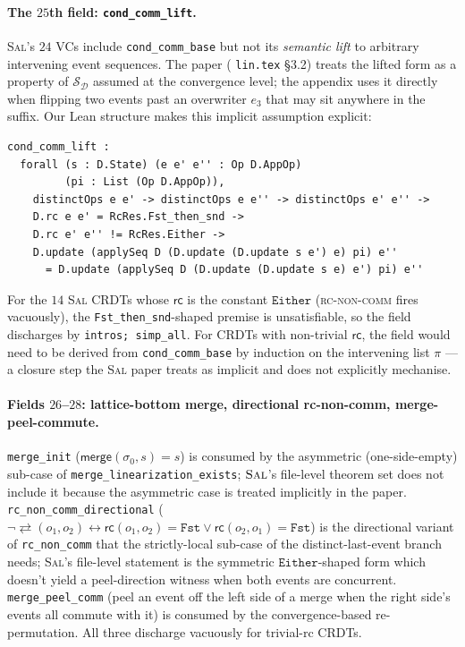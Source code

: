 \documentclass[11pt,a4paper]{article}
\theoremstyle{definition}
\theoremstyle{remark}
\newcommand{\RDT}{\ensuremath{\mathcal{D}}}
\newcommand{\mmerge}{\mathsf{merge}}
\newcommand{\mrc}{\mathsf{rc}}
\newcommand{\Either}{\mathtt{Either}}
\newcommand{\Fst}{\mathtt{Fst}}
\newcommand{\init}{\sigma_0}
\newcommand{\commute}{\mathrel{\rightleftarrows}}
\newcommand{\Sal}{\textsc{Sal}}
\begin{document}
\paragraph{The $25$th field: \texttt{cond\_comm\_lift}.}
\Sal{}'s $24$ VCs include \texttt{cond\_comm\_base} but not its
\emph{semantic lift} to arbitrary intervening event sequences. The
paper (\cite{sal2025} \texttt{lin.tex} §3.2) treats the lifted form
as a property of $\mathcal{S}_\RDT$ assumed at the convergence level;
the appendix uses it directly when flipping two events past an
overwriter $e_3$ that may sit anywhere in the suffix. Our Lean
structure makes this implicit assumption explicit:
\begin{lstlisting}[caption={The lifted \texttt{cond\_comm\_lift} field.},
                   label=lst:cond-comm-lift]
cond_comm_lift :
  forall (s : D.State) (e e' e'' : Op D.AppOp)
         (pi : List (Op D.AppOp)),
    distinctOps e e' -> distinctOps e e'' -> distinctOps e' e'' ->
    D.rc e e' = RcRes.Fst_then_snd ->
    D.rc e' e'' != RcRes.Either ->
    D.update (applySeq D (D.update (D.update s e') e) pi) e''
      = D.update (applySeq D (D.update (D.update s e) e') pi) e''
\end{lstlisting}
For the $14$ \Sal{} CRDTs whose $\mrc$ is the constant $\Either$
(\textsc{rc-non-comm} fires vacuously), the
\texttt{Fst\_then\_snd}-shaped premise is unsatisfiable, so the
field discharges by \texttt{intros; simp\_all}. For CRDTs with
non-trivial $\mrc$, the field would need to be derived from
\texttt{cond\_comm\_base} by induction on the intervening list
$\pi$ --- a closure step the \Sal{} paper treats as implicit and
does not explicitly mechanise.

\paragraph{Fields $26$--$28$: lattice-bottom merge, directional
rc-non-comm, merge-peel-commute.} \texttt{merge\_init}
($\mmerge(\init, s) = s$) is consumed by the asymmetric
(one-side-empty) sub-case of \texttt{merge\_linearization\_exists};
$\Sal$'s file-level theorem set does not include it because the
asymmetric case is treated implicitly in the paper.
\texttt{rc\_non\_comm\_directional} ($\neg \commute(o_1, o_2)
\leftrightarrow \mrc(o_1, o_2) = \Fst \lor \mrc(o_2, o_1) = \Fst$)
is the directional variant of \texttt{rc\_non\_comm} that the
strictly-local sub-case of the distinct-last-event branch needs;
\Sal{}'s file-level statement is the symmetric $\Either$-shaped
form which doesn't yield a peel-direction witness when both events
are concurrent. \texttt{merge\_peel\_comm} (peel an event off the
left side of a merge when the right side's events all commute with
it) is consumed by the convergence-based re-permutation. All three
discharge vacuously for trivial-rc CRDTs.
\end{document}
